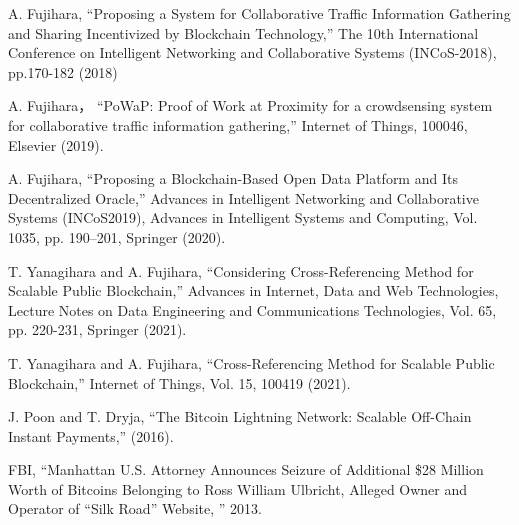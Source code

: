 \documentclass[graybox]{svmult}
\begin{document}
\begin{thebibliography}{99}
  A. Fujihara,
  ``Proposing a System for Collaborative Traffic Information Gathering and 
  Sharing Incentivized by Blockchain Technology,''
  The 10th International Conference on Intelligent Networking and 
  Collaborative Systems (INCoS-2018), pp.170-182 (2018)

  A. Fujihara，
  ``PoWaP: Proof of Work at Proximity for a crowdsensing system for 
  collaborative traffic information gathering,'' 
  Internet of Things, 100046, Elsevier (2019).

  A. Fujihara, 
  ``Proposing a Blockchain-Based Open Data Platform and Its Decentralized Oracle,''
  Advances in Intelligent Networking and Collaborative Systems (INCoS2019), 
  Advances in Intelligent Systems and Computing, 
  Vol. 1035, pp. 190--201, Springer (2020).

  T. Yanagihara and A. Fujihara, 
  ``Considering Cross-Referencing Method for Scalable Public Blockchain,''
  Advances in Internet, Data and Web Technologies, 
  Lecture Notes on Data Engineering and Communications Technologies, 
  Vol. 65, pp. 220-231, Springer (2021). 

  T. Yanagihara and A. Fujihara,
  ``Cross-Referencing Method for Scalable Public Blockchain,''
  Internet of Things, Vol. 15, 100419 (2021). 


  J. Poon and T. Dryja, 
  ``The Bitcoin Lightning Network: Scalable Off-Chain Instant Payments,'' 
  (2016). 


  FBI, 
  ``Manhattan U.S. Attorney Announces Seizure of Additional \$28 Million 
    Worth of Bitcoins Belonging to Ross William Ulbricht, Alleged Owner 
    and Operator of ``Silk Road'' Website, '' 2013.


\end{thebibliography}
\end{document}
